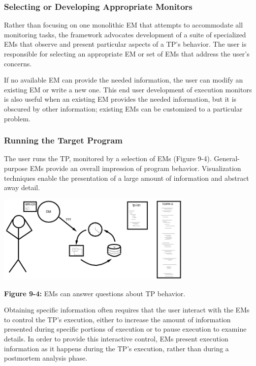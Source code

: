 \subsubsection*{Selecting or Developing Appropriate Monitors}

Rather than focusing on one monolithic EM that attempts to accommodate
all monitoring tasks, the framework advocates development of a suite
of specialized EMs that observe and present particular aspects of a
TP's behavior.  The user is responsible for selecting an appropriate
EM or set of EMs that address the user's
concerns.

If no available EM can provide the needed information,
the user can modify an existing EM or write a new one.  This end user
development of execution monitors is also useful when an existing EM
provides the needed information, but it is obscured by other
information; existing EMs can be customized to a particular problem.

\subsubsection*{Running the Target Program}

The user runs the TP, monitored by a selection of
EMs (Figure 9-4). General-purpose EMs provide an overall impression
of program behavior.  Visualization techniques enable the presentation
of a large amount of information and abstract away detail.

\begin{center}
\includegraphics[height=1.7in]{scene3.png}
\end{center}

{\sffamily\bfseries Figure 9-4:}
{\sffamily EMs can answer questions about TP behavior.}

\bigskip

Obtaining specific information often requires that the user
interact with the EMs to control the TP's execution, either to increase
the amount of information presented during specific portions of
execution or to pause execution to examine details.
In order to provide this interactive control, EMs present
execution information as it happens during the TP's execution,
rather than during a postmortem analysis phase.

